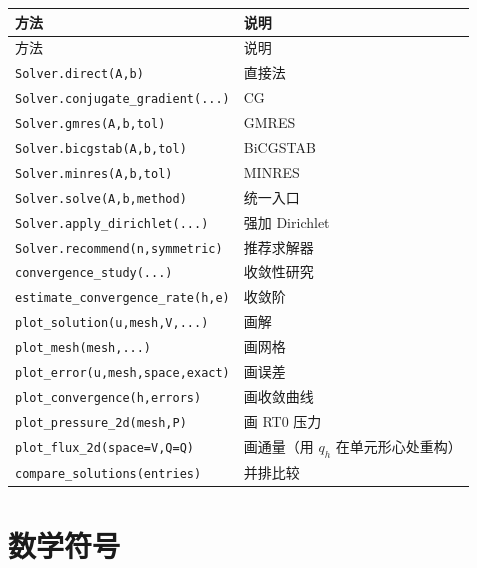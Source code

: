 \documentclass[UTF8,11pt,oneside]{ctexbook}
\theoremstyle{definition}
\theoremstyle{plain}
\newcommand{\code}[1]{\texttt{#1}}
\begin{document}
\begingroup\small
\begin{longtable}{@{}L{5.0cm}L{9.4cm}@{}}
\toprule
方法 & 说明 \\
\midrule
\endfirsthead
\toprule
方法 & 说明 \\
\midrule
\endhead
\code{Solver.direct(A,\allowbreak b)} & 直接法 \\
\code{Solver.conjugate\_\allowbreak gradient(...)} & CG \\
\code{Solver.gmres(A,\allowbreak b,\allowbreak tol)} & GMRES \\
\code{Solver.bicgstab(A,\allowbreak b,\allowbreak tol)} & BiCGSTAB \\
\code{Solver.minres(A,\allowbreak b,\allowbreak tol)} & MINRES \\
\code{Solver.solve(A,\allowbreak b,\allowbreak method)} & 统一入口 \\
\code{Solver.apply\_\allowbreak dirichlet(...)} & 强加 Dirichlet \\
\code{Solver.recommend(n,\allowbreak  symmetric)} & 推荐求解器 \\
\code{convergence\_\allowbreak study(...)} & 收敛性研究 \\
\code{estimate\_\allowbreak convergence\_\allowbreak rate(h,\allowbreak  e)} & 收敛阶 \\
\code{plot\_\allowbreak solution(u,\allowbreak  mesh,\allowbreak  V,\allowbreak  ...)} & 画解 \\
\code{plot\_\allowbreak mesh(mesh,\allowbreak  ...)} & 画网格 \\
\code{plot\_\allowbreak error(u,\allowbreak  mesh,\allowbreak  space,\allowbreak  exact)} & 画误差 \\
\code{plot\_\allowbreak convergence(h,\allowbreak  errors)} & 画收敛曲线 \\
\code{plot\_\allowbreak pressure\_\allowbreak 2d(mesh,\allowbreak  P)} & 画 RT0 压力 \\
\code{plot\_\allowbreak flux\_\allowbreak 2d(space=V,\allowbreak  Q=Q)} & 画通量（用 $q_h$ 在单元形心处重构） \\
\code{compare\_\allowbreak solutions(entries)} & 并排比较 \\
\bottomrule
\end{longtable}
\endgroup

\chapter{数学符号}
\label{app:notation}
\end{document}
